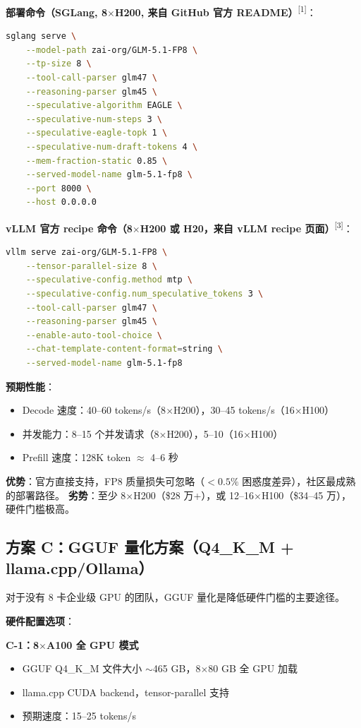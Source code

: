 \documentclass[UTF8,a4paper,10pt,oneside]{ctexart}
\begin{document}
\textbf{部署命令（SGLang, 8$\times$H200, 来自 GitHub 官方 README）}\textsuperscript{[1]}：
\begin{lstlisting}[language=bash]
sglang serve \
    --model-path zai-org/GLM-5.1-FP8 \
    --tp-size 8 \
    --tool-call-parser glm47 \
    --reasoning-parser glm45 \
    --speculative-algorithm EAGLE \
    --speculative-num-steps 3 \
    --speculative-eagle-topk 1 \
    --speculative-num-draft-tokens 4 \
    --mem-fraction-static 0.85 \
    --served-model-name glm-5.1-fp8 \
    --port 8000 \
    --host 0.0.0.0
\end{lstlisting}

\textbf{vLLM 官方 recipe 命令（8$\times$H200 或 H20，来自 vLLM recipe 页面）}\textsuperscript{[3]}：
\begin{lstlisting}[language=bash]
vllm serve zai-org/GLM-5.1-FP8 \
    --tensor-parallel-size 8 \
    --speculative-config.method mtp \
    --speculative-config.num_speculative_tokens 3 \
    --tool-call-parser glm47 \
    --reasoning-parser glm45 \
    --enable-auto-tool-choice \
    --chat-template-content-format=string \
    --served-model-name glm-5.1-fp8
\end{lstlisting}

\textbf{预期性能}：
\begin{itemize}
    \item Decode 速度：40--60 tokens/s（8$\times$H200），30--45 tokens/s（16$\times$H100）
    \item 并发能力：8--15 个并发请求（8$\times$H200），5--10（16$\times$H100）
    \item Prefill 速度：128K token $\approx$ 4--6 秒
\end{itemize}

\textbf{优势}：官方直接支持，FP8 质量损失可忽略（$<0.5\%$ 困惑度差异），社区最成熟的部署路径。\newline
\textbf{劣势}：至少 8$\times$H200（\$28 万+），或 12--16$\times$H100（\$34--45 万），硬件门槛极高。

\subsection{方案 C：GGUF 量化方案（Q4\_K\_M + llama.cpp/Ollama）}

对于没有 8 卡企业级 GPU 的团队，GGUF 量化是降低硬件门槛的主要途径。

\textbf{硬件配置选项}：

\textbf{C-1：8$\times$A100 全 GPU 模式}
\begin{itemize}
    \item GGUF Q4\_K\_M 文件大小 $\sim$465 GB，8$\times$80 GB 全 GPU 加载
    \item llama.cpp CUDA backend，tensor-parallel 支持
    \item 预期速度：15--25 tokens/s
\end{itemize}
\end{document}
